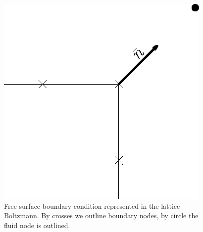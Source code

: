 \documentclass{article}
\begin{document}
\begin{figure}
\includegraphics[width=\textwidth]{Figures/free_surface.eps}
\caption{Free-surface boundary condition represented in the lattice Boltzmann. By crosses we outline boundary nodes, by circle the fluid node is outlined. \label{fig:free:surface}}
\end{figure}


\end{document}
